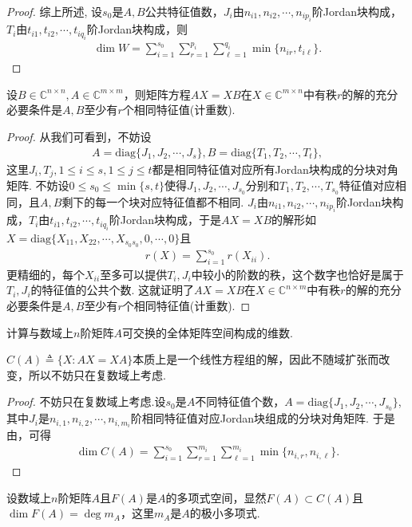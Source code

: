 \documentclass[../../main.tex]{subfiles}
\begin{document}
\begin{proof}
综上所述,
设$s_0$是$A, B$公共特征值数，$J_i$由$n_{i1}, n_{i2}, \cdots, n_{ip_i}$阶Jordan块构成，$T_i$由$t_{i1}, t_{i2}, \cdots, t_{iq_i}$阶Jordan块构成，则
\begin{align}
\dim W = \sum_{i = 1}^{s_0}\sum_{r = 1}^{p_i}\sum_{\ell = 1}^{q_i}\min\{n_{ir}, t_{i\ell}\}. \label{23.16}
\end{align}
\end{proof}

\begin{corollary}\label{corollary:AX-XB相关命题1}
设$B\in\mathbb{C}^{n\times n}, A\in\mathbb{C}^{m\times m}$，则矩阵方程$AX = XB$在$X\in\mathbb{C}^{m\times n}$中有秩$r$的解的充分必要条件是$A,B$至少有$r$个相同特征值(计重数).
\end{corollary}
\begin{proof}
从我们可看到，不妨设
\begin{align*}
A = \mathrm{diag}\{J_1, J_2, \cdots, J_s\}, B = \mathrm{diag}\{T_1, T_2, \cdots, T_t\},
\end{align*}
这里$J_i, T_j, 1\leqslant i\leqslant s, 1\leqslant j\leqslant t$都是相同特征值对应所有Jordan块构成的分块对角矩阵. 不妨设$0\leqslant s_0\leqslant\min\{s, t\}$使得$J_1, J_2, \cdots, J_{s_0}$分别和$T_1, T_2, \cdots, T_{s_0}$特征值对应相同，且$A,B$剩下的每一个块对应特征值都不相同. $J_i$由$n_{i1}, n_{i2}, \cdots, n_{ip_i}$阶Jordan块构成，$T_i$由$t_{i1}, t_{i2}, \cdots, t_{iq_i}$阶Jordan块构成，于是$AX = XB$的解形如$X = \mathrm{diag}\{X_{11}, X_{22}, \cdots, X_{s_0s_0}, 0, \cdots, 0\}$且
\begin{align*}
r(X) = \sum_{i = 1}^{s_0}r(X_{ii}).
\end{align*}
更精细的，每个$X_{ii}$至多可以提供$T_i, J_i$中较小的阶数的秩，这个数字也恰好是属于$T_i, J_i$的特征值的公共个数. 这就证明了$AX = XB$在$X\in\mathbb{C}^{n\times m}$中有秩$r$的解的充分必要条件是$A,B$至少有$r$个相同特征值(计重数). 
\end{proof}

\begin{corollary}\label{corollary:AX-XB相关命题3}
计算与数域上$n$阶矩阵$A$可交换的全体矩阵空间构成的维数. 
\end{corollary}
\begin{note}
$C(A)\triangleq\{X: AX = XA\}$本质上是一个线性方程组的解，因此不随域扩张而改变，所以不妨只在复数域上考虑.
\end{note}
\begin{proof}
不妨只在复数域上考虑.设$s_0$是$A$不同特征值个数，$A = \mathrm{diag}\{J_1, J_2, \cdots, J_{s_0}\}$,其中$J_i$是$n_{i,1},n_{i,2},\cdots,n_{i,m_i}$阶相同特征值对应Jordan块组成的分块对角矩阵.
于是由，可得
\begin{align*}
\dim C(A) = \sum_{i = 1}^{s_0}\sum_{r = 1}^{m_i}\sum_{\ell = 1}^{m_i}\min\{n_{i,r}, n_{i,\ell}\}.
\end{align*}
\end{proof}
\begin{conclusion}
设数域上$n$阶矩阵$A$且$F(A)$是$A$的多项式空间，显然$F(A)\subset C(A)$且$\dim F(A)=\deg m_A$，这里$m_A$是$A$的极小多项式.
\end{conclusion}
\end{document}
